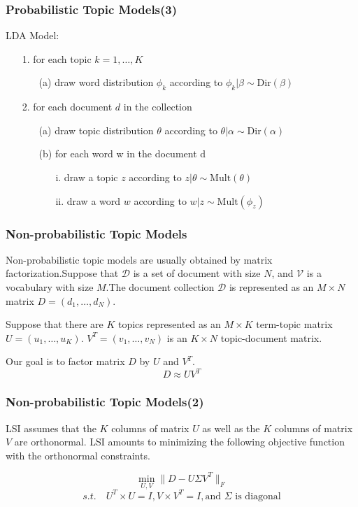 \documentclass[slidestop,compress,mathserif]{beamer}
\begin{document}
	\begin{frame}
		\frametitle{Probabilistic Topic Models(3)}
		LDA Model:
		\begin{figure}
		\end{figure}
		\begin{itemize}
			\item[1.] for each topic $k=1,\ldots,K$
			\begin{itemize}
				\item[(a)] draw word distribution $\phi_k$ according to $\phi_k|\beta\sim\mathrm{Dir}(\beta)$
			\end{itemize}
			\item[2.] for each document $d$ in the collection
			\begin{itemize}
				\item[(a)] draw topic distribution $\theta$ according to $\theta|\alpha\sim\mathrm{Dir}(\alpha)$
				\item[(b)] for each word w in the document d
				\begin{itemize}
					\item[i.] draw a topic $z$ according to $z|\theta\sim\mathrm{Mult}(\theta)$
					\item[ii.] draw a word $w$ according to $w|z\sim\mathrm{Mult}(\phi_z)$
				\end{itemize}
			\end{itemize}
		\end{itemize}
	\end{frame}
	\begin{frame}
		\frametitle{Non-probabilistic Topic Models}
		Non-probabilistic topic models are usually obtained by matrix factorization.Suppose that $\mathcal{D}$ is a set of document with size $N$, and $\mathcal{V}$ is a vocabulary with size $M$.The document collection $\mathcal{D}$ is represented as an $M\times N$ matrix $D=(d_1,\ldots,d_N)$. 
		
		Suppose that there are $K$ topics represented as an $M\times K$ term-topic matrix $U=(u_1,\ldots,u_K)$. $V^T=(v_1,\ldots,v_N)$ is an $K\times N$ topic-document matrix.
		
		Our goal is to factor matrix $D$ by $U$ and $V^T$.
		$$D\approx UV^T$$
	\end{frame}
	\begin{frame}
		\frametitle{Non-probabilistic Topic Models(2)}
		LSI assumes that the $K$ columns of matrix $U$ as well as the $K$ columns of matrix $V$ are orthonormal. LSI amounts to minimizing the following objective function with the orthonormal constraints.
		
		$$ \min_{U,V}\|D-U\Sigma V^T\|_F$$
		$$ s.t.\quad U^T \times U=I, V\times V^T=I, \mbox{and $\Sigma$ is diagonal} $$
		\begin{figure}
			\pgfimage[width=8cm ]{"image/21.png"}
		\end{figure}

	\end{frame}
\end{document}

